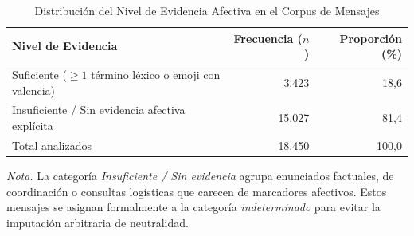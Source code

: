 \begin{table}[htbp]
  \centering
  \small
  \caption{Distribución del Nivel de Evidencia Afectiva en el Corpus de Mensajes}
  \label{tab:nivel_evidencia}
  \begin{tabular}{lrr}
    \toprule
    Nivel de Evidencia & Frecuencia ($n$) & Proporción (\%) \\
    \midrule
    Suficiente ($\ge 1$ término léxico o emoji con valencia) & 3.423 & 18,6 \\
    Insuficiente / Sin evidencia afectiva explícita          & 15.027 & 81,4 \\
    \midrule
    Total analizados                                         & 18.450 & 100,0 \\
    \bottomrule
  \end{tabular}
  \vspace{4pt}
  \begin{minipage}{0.85\textwidth}
    \footnotesize
    \textit{Nota.} La categoría \emph{Insuficiente / Sin evidencia} agrupa enunciados factuales, de coordinación o consultas logísticas que carecen de marcadores afectivos. Estos mensajes se asignan formalmente a la categoría \emph{indeterminado} para evitar la imputación arbitraria de neutralidad.
  \end{minipage}
\end{table}
